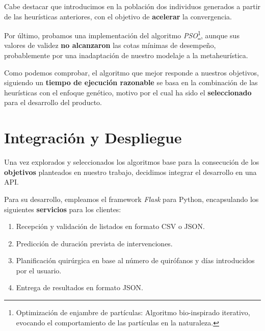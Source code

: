  Cabe destacar que introducimos en la población dos individuos generados a partir de las heurísticas anteriores, con el objetivo de \textbf{acelerar} la convergencia.

 Por último, probamos una implementación del algoritmo \textit{PSO}\footnote{Optimización de enjambre de partículas:  Algoritmo bio-inspirado iterativo, evocando el comportamiento de las partículas en la naturaleza.}, aunque sus valores de validez \textbf{no alcanzaron }las cotas mínimas de desempeño, probablemente por una inadaptación de nuestro modelaje a la metaheurística.


 Como podemos comprobar, el algoritmo que mejor responde a nuestros objetivos, siguiendo un \textbf{tiempo de ejecución razonable} se basa en la combinación de las heurísticas con el enfoque genético, motivo por el cual ha sido el \textbf{seleccionado} para el desarrollo del producto.


 \newpage

 \section{Integración y Despliegue}

 Una vez explorados y seleccionados los algoritmos base para la consecución de los \textbf{objetivos} planteados en nuestro trabajo, decidimos integrar el desarrollo en una API.

 Para su desarrollo, empleamos el framework \textit{Flask} \cite{Grinberg2018FlaskPython} para Python, encapsulando los siguientes \textbf{servicios} para los clientes:
 
 \begin{enumerate}
     \item Recepción y validación de listados en formato CSV o JSON.
     \item Predicción de duración prevista de intervenciones.
     \item Planificación quirúrgica en base al número de quirófanos y días introducidos por el usuario.
     \item Entrega de resultados en formato JSON.
 \end{enumerate}

